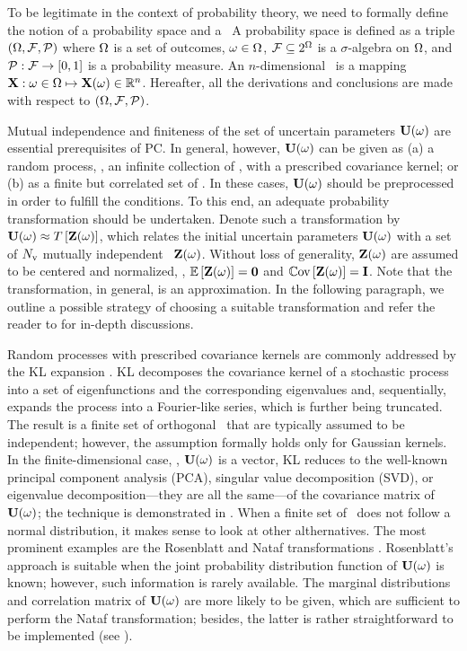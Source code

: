 To be legitimate in the context of probability theory, we need to formally define the notion of a probability space and a \rv\ A probability space  \cite{maitre2010} is defined as a triple $(\Omega, \mathcal{F}, \mathcal{P})$ where $\Omega$ is a set of outcomes, $\omega \in \Omega$, $\mathcal{F} \subseteq 2^\Omega$ is a $\sigma$-algebra on $\Omega$, and $\mathcal{P}: \mathcal{F} \to [0, 1]$ is a probability measure. An $n$-dimensional \rv\ is a mapping $\mathbf{X}: \omega \in \Omega \mapsto \mathbf{X}(\omega) \in \mathbb{R}^n$. Hereafter, all the derivations and conclusions are made with respect to $(\Omega, \mathcal{F}, \mathcal{P})$.

Mutual independence and finiteness of the set of uncertain parameters $\mathbf{U}(\omega)$ are essential prerequisites of PC. In general, however, $\mathbf{U}(\omega)$ can be given as (a) a random process, \ie, an infinite collection of \rvs, with a prescribed covariance kernel; or (b) as a finite but correlated set of \rvs. In these cases, $\mathbf{U}(\omega)$ should be preprocessed in order to fulfill the conditions. To this end, an adequate probability transformation should be undertaken. Denote such a transformation by $\mathbf{U}(\omega) \approx T\left[\mathbf{Z}(\omega)\right]$, which relates the initial uncertain parameters $\mathbf{U}(\omega)$ with a set of ${N_\text{v}}$ mutually independent \rvs\ $\mathbf{Z}(\omega)$. Without loss of generality, $\mathbf{Z}(\omega)$ are assumed to be centered and normalized, \ie, $\oExp{\vZ(\o)} = \mZero$ and $\oCov{\vZ(\o)} = \mI$. Note that the transformation, in general, is an approximation. In the following paragraph, we outline a possible strategy of choosing a suitable transformation and refer the reader to \cite{xiu2010, eldred2009} for in-depth discussions.

Random processes with prescribed covariance kernels are commonly addressed by the KL expansion \cite{xiu2010, maitre2010, ghanem1991}. KL decomposes the covariance kernel of a stochastic process into a set of eigenfunctions and the corresponding eigenvalues and, sequentially, expands the process into a Fourier-like series, which is further being truncated. The result is a finite set of orthogonal \rvs\ that are typically assumed to be independent; however, the assumption formally holds only for Gaussian kernels. In the finite-dimensional case, \ie, $\mathbf{U}(\omega)$ is a vector, KL reduces to the well-known principal component analysis (PCA), singular value decomposition (SVD), or eigenvalue decomposition---they are all the same---of the covariance matrix of $\mathbf{U}(\omega)$; the technique is demonstrated in . When a finite set of \rvs\ does not follow a normal distribution, it makes sense to look at other althernatives. The most prominent examples are the Rosenblatt and Nataf transformations \cite{eldred2009}. Rosenblatt's approach is suitable when the joint probability distribution function of $\mathbf{U}(\omega)$ is known; however, such information is rarely available. The marginal distributions and correlation matrix of $\mathbf{U}(\omega)$ are more likely to be given, which are sufficient to perform the Nataf transformation; besides, the latter is rather straightforward to be implemented (see \cite{li2008}).
